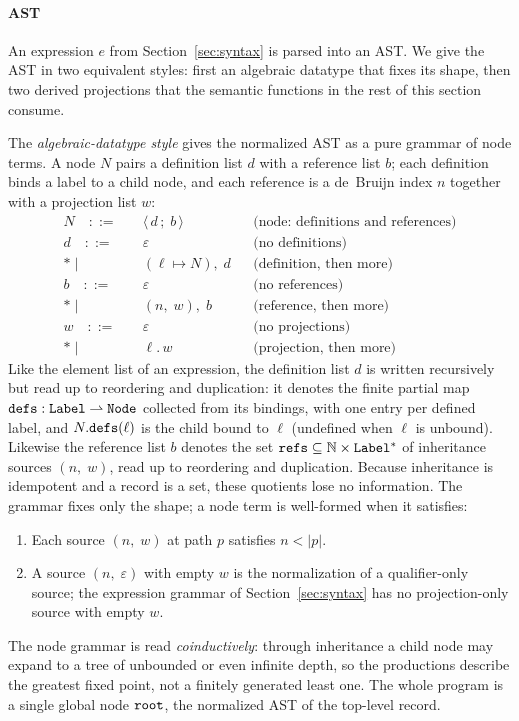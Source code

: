 \paragraph{AST}
An expression $e$ from Section~\ref{sec:syntax} is parsed into an AST.
We give the AST in two equivalent styles: first an algebraic
datatype that fixes its shape, then two derived projections that
the semantic functions in the rest of this section consume.

The \emph{algebraic-datatype style} gives the normalized AST as a pure
grammar of node terms. A node $N$ pairs a definition list $d$ with a
reference list $b$; each definition binds a label to a child node, and
each reference is a de~Bruijn index $n$ together with a projection list
$w$:
\begin{align*}
  N \quad ::= \quad & \langle\, d \,;\; b \,\rangle
  && \text{(node: definitions and references)} \\[6pt]
  d \quad ::= \quad & \varepsilon
  && \text{(no definitions)} \\*
  \mid\quad & (\ell \mapsto N),\; d
  && \text{(definition, then more)} \\[6pt]
  b \quad ::= \quad & \varepsilon
  && \text{(no references)} \\*
  \mid\quad & (n,\; w),\; b
  && \text{(reference, then more)} \\[6pt]
  w \quad ::= \quad & \varepsilon
  && \text{(no projections)} \\*
  \mid\quad & \ell.\, w
  && \text{(projection, then more)}
\end{align*}
Like the element list of an expression, the definition list $d$ is
written recursively but read up to reordering and duplication: it
denotes the finite partial map $\mathtt{defs} : \mathtt{Label} \rightharpoonup \mathtt{Node}$
collected from its bindings, with one entry per defined label, and
$N.\mathtt{defs}(\ell)$ is the child bound to $\ell$ (undefined when $\ell$ is
unbound). Likewise the reference list $b$ denotes the set
$\mathtt{refs} \subseteq \mathbb{N} \times \mathtt{Label}^{*}$ of inheritance sources
$(n,\; w)$, read up to reordering and duplication. Because inheritance
is idempotent and a record is a set, these quotients lose no
information.
The grammar fixes only the shape; a node term is well-formed when it
satisfies:
\begin{enumerate}
  \item Each source $(n,\; w)$ at path $p$ satisfies $n < |p|$.
  \item A source $(n,\; \varepsilon)$ with empty $w$ is the
    normalization of a qualifier-only source; the expression grammar of
    Section~\ref{sec:syntax} has no projection-only source with empty
    $w$.
\end{enumerate} The node grammar is read \emph{coinductively}: through
inheritance a child node may expand to a tree of unbounded or even
infinite depth, so the productions describe the greatest fixed point,
not a finitely generated least one. The whole program is a single
global node $\mathtt{root}$, the normalized AST of the top-level record.

